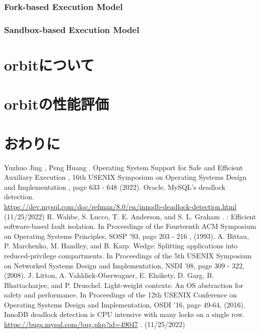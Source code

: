 \documentclass[submit,techreq,noauthor]{eco}	%
\begin{document}
\subsubsection*{Fork-based Execution Model}

\subsubsection*{Sandbox-based Execution Model}


\section{orbitについて}


\section{orbitの性能評価}


\section{おわりに}



\begin{thebibliography}{99}
   Yuzhuo Jing , Peng Huang . Operating System 
  Support for Safe and Efficient Auxiliary Execution , 16th 
  USENIX Symposium on Operating Systems Design and Implementation ,
   page 633 - 648 (2022).
   Oracle. MySQL's deadlock detection.\\
  \url{https://dev.mysql.com/doc/refman/8.0/en/innodb-deadlock-detection.html}
  (11/25/2022)
   R. Wahbe, S. Lucco, T. E. Anderson, and S. L. Graham .
  : Efficient software-based fault isolation. In Proceedings of the 
  Fourteenth ACM Symposium on Operating Systems Principles, SOSP '93,
   page 203 - 216 , (1993).
  A. Bittau, P. Marchenko, M. Handley, and B. Karp. 
  Wedge: Splitting applications into reduced-privilege compartments.
   In Proceedings of the 5th USENIX Symposium on Networked Systems 
   Design and Implementation, NSDI '08, page 309 - 322, (2008).
  J. Litton, A. Vahldiek-Oberwagner, E. Elnikety, D. 
  Garg, B. Bhattacharjee, and P. Druschel. Light-weight contexts: 
  An OS abstraction for safety and performance. In Proceedings of
  the 12th USENIX Conference on Operating Systems Design and Implementation,
   OSDI '16, page 49-64, (2016).
  InnoDB deadlock detection is CPU intensive with many locks on a single row.
    \url{https://bugs.mysql.com/bug.php?id=49047} . (11/25/2022)
\end{thebibliography}
\end{document}
